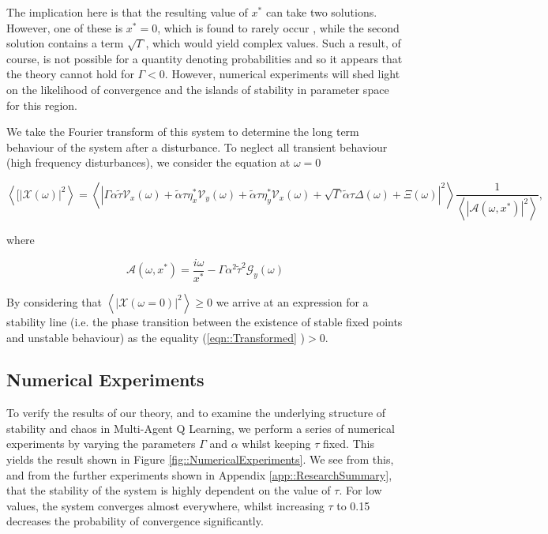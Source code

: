 \documentclass[.../main.tex]{subfiles}
\begin{document}
    The implication here is that the resulting value of $x^*$ can take two solutions. However, one
    of these is $x^* = 0$, which is found to rarely occur \cite{Coolen2005}, while the second solution
    contains a term $\sqrt{\Gamma}$, which would yield complex values. Such a result, of course, is
    not possible for a quantity denoting probabilities and so it appears that the theory cannot hold
    for $\Gamma < 0$. However, numerical experiments will shed light on the likelihood of
    convergence and the islands of stability in parameter space for this region.

    We take the Fourier transform of this system to determine the long term behaviour of the system
    after a disturbance. To neglect all transient behaviour (high frequency disturbances), we
    consider the equation at $\omega = 0$

    \begin{equation} \label{eqn::Transformed}
    \left<[|\mathcal{X}(\omega)|^2 \right> = \left< | \Gamma \alpha \tilde{\tau} \mathcal{V}_x(\omega) + \tilde{\alpha} \tau \eta^*_x \mathcal{V}_y(\omega) + \tilde{\alpha} \tau \eta^*_y \mathcal{V}_x(\omega) + \sqrt{\Gamma} \tilde{\alpha} \tau \Delta(\omega) + \Xi(\omega) |^2 \right> \frac{1}{\left< |\mathcal{A}(\omega, x^*) |^2 \right>}, 
    \end{equation}


    where

    \begin{equation}
        \mathcal{A}(\omega, x^*) = \frac{i \omega}{x^*} - \Gamma \alpha^2 \tilde{\tau}^2 \mathcal{G}_y(\omega)
    \end{equation}

    By
    considering that $\left<|\mathcal{X}(\omega =
    0)|^2
    \right> \geq 0$  we arrive at an expression for a stability line (i.e. the phase transition
    between the
    existence of stable fixed points and unstable behaviour) as the equality (\ref{eqn::Transformed}
    )$>0$.


    \subsection{Numerical Experiments} %
    \label{sub:numerical_experiments}
    
    To verify the results of our theory, and to examine the underlying structure of stability and
    chaos in Multi-Agent Q Learning, we perform a series of numerical experiments by varying the
    parameters $\Gamma$ and $\alpha$ whilst keeping $\tau$ fixed. This yields the result shown in
    Figure \ref{fig::NumericalExperiments}. We see from this, and from the further experiments shown
    in Appendix \ref{app::ResearchSummary}, that the stability of the system is highly dependent on
    the value of $\tau$.
    For
    low values, the system converges almost everywhere, whilst increasing $\tau$ to 0.15 decreases
    the probability of convergence significantly.
\end{document}
